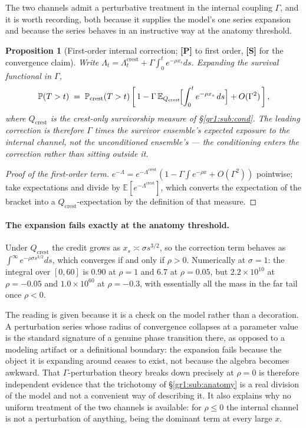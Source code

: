 \documentclass[11pt]{article}
\numberwithin{equation}{section}
\theoremstyle{plain}
\newtheorem{proposition}[theorem]{Proposition}
\theoremstyle{definition}
\theoremstyle{remark}
\newcommand{\E}{\mathbb{E}}
\newcommand{\PP}{\mathbb{P}}
\begin{document}
The two channels admit a perturbative treatment in the internal
coupling $\Gamma$, and it is worth recording, both because it supplies
the model's one series expansion and because the series behaves in an
instructive way at the anatomy threshold.

\begin{proposition}[First-order internal correction; \textbf{[P]} to
first order, \textbf{[S]} for the convergence claim]
\label{gr1:prop:perturb}
Write $\Lambda_t=\Lambda^{\mathrm{crest}}_t+\Gamma\int_0^te^{-\rho
x_s}ds$. Expanding the survival functional in $\Gamma$,
\begin{equation}\label{gr1:eq:perturb}
\PP(T>t)\;=\;\PP_{\mathrm{crest}}(T>t)\left[\,1-\Gamma\,
\E_{Q_{\mathrm{crest}}}\!\Bigl[\int_0^t e^{-\rho x_s}\,ds\Bigr]
+O(\Gamma^{2})\,\right],
\end{equation}
where $Q_{\mathrm{crest}}$ is the crest-only survivorship measure of
\S\ref{gr1:sub:cond}. The leading correction is therefore $\Gamma$ times
the \emph{survivor ensemble's} expected exposure to the internal
channel, not the unconditioned ensemble's --- the conditioning enters
the correction rather than sitting outside it.
\end{proposition}

\begin{proof}[Proof of the first-order term]
$e^{-\Lambda}=e^{-\Lambda^{\mathrm{crest}}}(1-\Gamma\int
e^{-\rho x}+O(\Gamma^{2}))$ pointwise; take expectations and divide by
$\E[e^{-\Lambda^{\mathrm{crest}}}]$, which converts the expectation of
the bracket into a $Q_{\mathrm{crest}}$-expectation by the definition of
that measure.
\end{proof}

\paragraph{The expansion fails exactly at the anatomy threshold.}\label{gr1:rem:perturbfail}
Under $Q_{\mathrm{crest}}$ the credit grows as $x_s\asymp\sigma
s^{3/2}$, so the correction term behaves as
$\int^\infty e^{-\rho\sigma s^{3/2}}ds$, which converges if and only if
$\rho>0$. Numerically at $\sigma=1$: the integral over $[0,60]$ is
$0.90$ at $\rho=1$ and $6.7$ at $\rho=0.05$, but $2.2\times10^{10}$ at
$\rho=-0.05$ and $1.0\times10^{60}$ at $\rho=-0.3$, with essentially all
the mass in the far tail once $\rho<0$.

The reading is given because it is a check on the model rather
than a decoration. A perturbation series whose radius of convergence
collapses at a parameter value is the standard signature of a genuine
phase transition there, as opposed to a modeling artifact or a
definitional boundary: the expansion fails because the object it is
expanding around ceases to exist, not because the algebra becomes
awkward. That $\Gamma$-perturbation theory breaks down precisely at
$\rho=0$ is therefore independent evidence that the trichotomy of
\S\ref{gr1:sub:anatomy} is a real division of the model and not a
convenient way of describing it. It also explains why no uniform
treatment of the two channels is available: for $\rho\le0$ the internal
channel is not a perturbation of anything, being the dominant term at
every large $x$.
\end{document}
